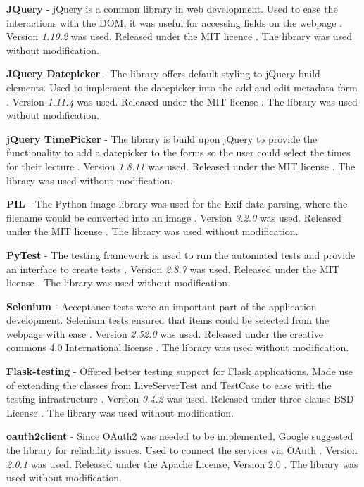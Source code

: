 \textbf{JQuery} - jQuery is a common library in web development. Used to ease the interactions with the DOM, it was useful for accessing fields on the webpage \cite{citeulike:14025897}. Version \textit{1.10.2} was used. Released under the MIT licence \cite{citeulike:14025880}. The library was used without modification.

\textbf{JQuery Datepicker} - The library offers default styling to jQuery build elements. Used to implement the datepicker into the add and edit metadata form \cite{citeulike:14025900}. Version \textit{1.11.4} was used. Released under the MIT license \cite{citeulike:14025880}. The library was used without modification.

\textbf{jQuery TimePicker} - The library is build upon jQuery to provide the functionality to add a datepicker to the forms so the user could select the times for their lecture \cite{citeulike:14004013}. Version \textit{1.8.11} was used. Released under the MIT license \cite{citeulike:14025880}. The library was used without modification.

\textbf{PIL} - The Python image library was used for the Exif data parsing, where the filename would be converted into an image \cite{citeulike:14024992}. Version \textit{3.2.0} was used. Released under the MIT license \cite{citeulike:14025880}. The library was used without modification.

\textbf{PyTest} - The testing framework is used to run the automated tests and provide an interface to create tests \cite{citeulike:1402058}. Version \textit{2.8.7} was used. Released under the MIT license \cite{citeulike:14025880}. The library was used without modification.

\textbf{Selenium} - Acceptance tests were an important part of the application development. Selenium tests ensured that items could be selected from the webpage with ease \cite{citeulike:14020625}. Version \textit{2.52.0} was used. Released under the creative commons 4.0 International license \cite{citeulike:14025914}. The library was used without modification.

\textbf{Flask-testing} - Offered better testing support for Flask applications. Made use of extending the classes from LiveServerTest and TestCase to ease with the testing infrastructure \cite{citeulike:14020588}. Version \textit{0.4.2} was used. Released under three clause BSD License \cite{citeulike:14025861}. The library was used without modification.

\textbf{oauth2client} - Since OAuth2 was needed to be implemented, Google suggested the library for reliability issues. Used to connect the services via OAuth \cite{citeulike:14025877}. Version \textit{2.0.1} was used. Released under the Apache License, Version 2.0 \cite{apache_license}. The library was used without modification.

